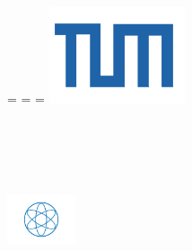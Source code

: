 \begin{titlepage}
\oddsidemargin=\evensidemargin\relax
\textwidth=\dimexpr{}\evensidemargin-2in\relax
\hsize=\textwidth\relax
\centering
\vspace{50mm}
\includegraphics[width=40mm]{./includes/logo/tum} \\
\vspace{10mm}
{\Huge\MakeUppercase{\getUniversity{}}} \\
\vspace{15mm}
{\huge\MakeUppercase{\getFaculty{}}} \\
\vspace{20mm}
{\Large \getDoctype{}} \\
\vspace{15mm}
{\huge\bfseries \getTitle{}} \\
\vspace{15mm}
{\LARGE \getAuthor{}} \\
\vspace{20mm}
\includegraphics[width=20mm]{./includes/logo/physics}
\end{titlepage}